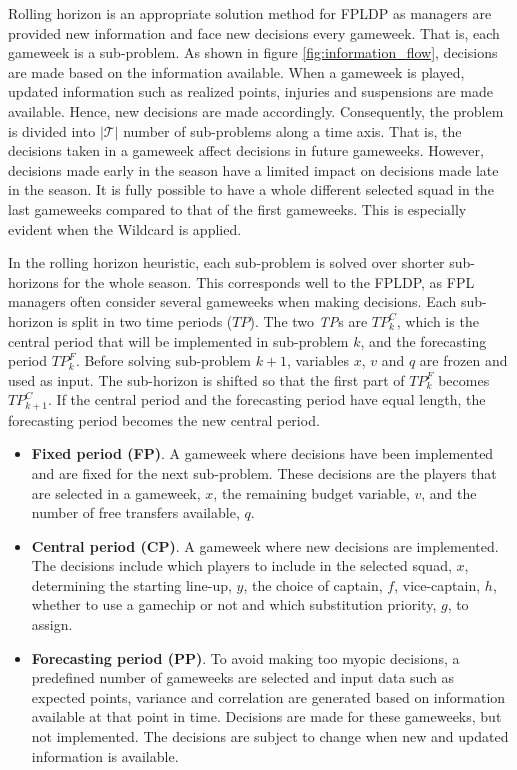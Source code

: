 Rolling horizon is an appropriate solution method for FPLDP as managers are provided new information and face new decisions every gameweek. That is, each gameweek is a sub-problem. As shown in figure \ref{fig:information_flow}, decisions are made based on the information available. When a gameweek is played, updated information such as realized points, injuries and suspensions are made available. Hence, new decisions are made accordingly. Consequently, the problem is divided into $\mathcal{|T|}$ number of sub-problems along a time axis. That is, the decisions taken in a gameweek affect decisions in future gameweeks. However, decisions made early in the season have a limited impact on decisions made late in the season. It is fully possible to have a whole different selected squad in the last gameweeks compared to that of the first gameweeks. This is especially evident when the Wildcard is applied.

\newpar

In the rolling horizon heuristic, each sub-problem is solved over shorter sub-horizons for the whole season. This corresponds well to the FPLDP, as FPL managers often consider several gameweeks when making decisions. Each sub-horizon is split in two time periods ($TP$). The two \textit{TP}s are $TP_k^{C}$, which is the central period that will be implemented in sub-problem $k$, and the forecasting period $TP_k^{F}$. Before solving sub-problem $k+1$, variables $x$, $v$ and $q$ are frozen and used as input. The sub-horizon is shifted so that the first part of $TP_k^{F}$ becomes $TP_{k+1}^{C}$. If the central period and the forecasting period have equal length, the forecasting period becomes the new central period. 

\begin{itemize}
    \item \textbf{Fixed period (FP)}. A gameweek where decisions have been implemented and are fixed for the next sub-problem. These decisions are the players that are selected in a gameweek, $x$, the remaining budget variable, $v$, and the number of free transfers available, $q$.
    \item \textbf{Central period (CP)}. A gameweek where new decisions are implemented. The decisions include which players to include in the selected squad, $x$, determining the starting line-up, $y$, the choice of captain, $f$,  vice-captain, $h$, whether to use a gamechip or not and which substitution priority, $g$, to assign.  
    \item \textbf{Forecasting period (PP)}. To avoid making too myopic decisions, a predefined number of gameweeks are selected and input data such as expected points, variance and correlation are generated based on information available at that point in time. Decisions are made for these gameweeks, but not implemented.  The decisions are subject to change when new and updated information is available. 
\end{itemize}

